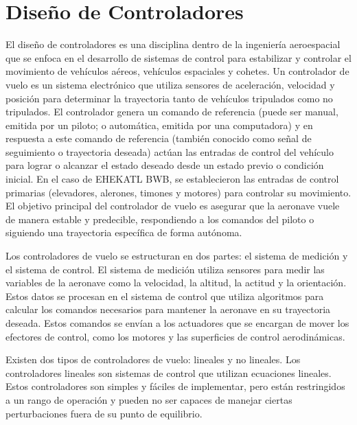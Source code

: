 \chapter{Diseño de Controladores}

El diseño de controladores es una disciplina dentro de la ingeniería aeroespacial que se enfoca en el desarrollo de sistemas de control para estabilizar y controlar el movimiento de vehículos aéreos, vehículos espaciales y cohetes.
Un controlador de vuelo es un sistema electrónico que utiliza sensores de aceleración, velocidad y posición para determinar la trayectoria tanto de vehículos tripulados como no tripulados.  El controlador genera un comando de referencia (puede ser manual, emitida por un piloto; o automática, emitida por una computadora) y en respuesta a este comando de referencia (también conocido como señal de seguimiento o trayectoria deseada)  actúan las entradas de control del vehículo para lograr o alcanzar el estado deseado desde un estado previo o condición inicial. En el caso de EHEKATL BWB, se establecieron las entradas de control primarias (elevadores, alerones, timones y motores) para controlar su movimiento. El objetivo principal del controlador de vuelo es asegurar que la aeronave vuele de manera estable y predecible, respondiendo a los comandos del piloto o siguiendo una trayectoria específica de forma autónoma.

Los controladores de vuelo se estructuran en dos partes: el sistema de medición y el sistema de control. El sistema de medición utiliza sensores para medir las variables de la aeronave como la velocidad, la altitud, la actitud y la orientación. Estos datos se procesan en el sistema de control que utiliza algoritmos para calcular los comandos necesarios para mantener la aeronave en su trayectoria deseada. Estos comandos se envían a los actuadores que se encargan de mover los efectores de control, como los motores y las superficies de control aerodinámicas.

Existen dos tipos de controladores de vuelo: lineales y no lineales. Los controladores lineales son sistemas de control que utilizan ecuaciones lineales. Estos controladores son simples y fáciles de implementar, pero están restringidos a un rango de operación y pueden no ser capaces de manejar ciertas perturbaciones fuera de su punto de equilibrio. 

